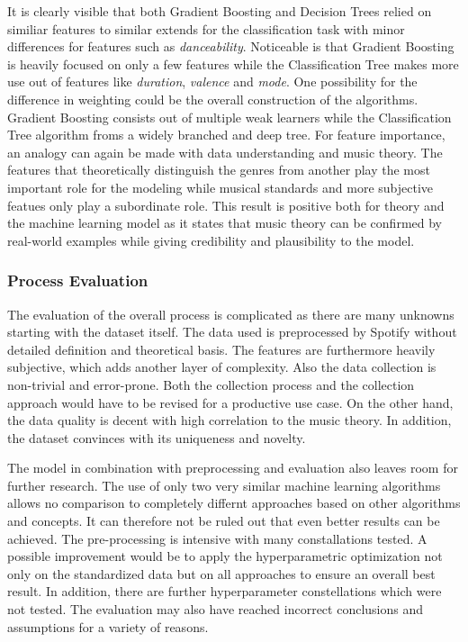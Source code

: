 It is clearly visible that both Gradient Boosting and Decision Trees relied on similiar features to similar extends for the classification task with 
minor differences for features such as \emph{danceability}. Noticeable is that Gradient Boosting is heavily focused on only a few features 
while the Classification Tree makes more use out of features like \emph{duration}, \emph{valence} and \emph{mode}. One possibility for the difference in weighting  
could be the overall construction of the algorithms. Gradient Boosting consists out of multiple weak learners while the Classification Tree
algorithm froms a widely branched and deep tree. For feature importance, an analogy can again be made with data understanding and music theory. 
The features that theoretically distinguish the genres from another play the most important role for the modeling while musical standards and 
more subjective featues only play a subordinate role. This result is positive both for theory and the machine learning model as it states 
that music theory can be confirmed by real-world examples while giving credibility and plausibility to the model.

\subsubsection{Process Evaluation}

The evaluation of the overall process is complicated as there are many unknowns starting with the dataset itself. The data used is preprocessed by 
Spotify without detailed definition and theoretical basis. The features are furthermore heavily subjective, which adds another layer of 
complexity. Also the data collection is non-trivial and error-prone. Both the collection process and the collection approach 
would have to be revised for a productive use case. On the other hand, the data quality is decent with high correlation to the music 
theory. In addition, the dataset convinces with its uniqueness and novelty.

The model in combination with preprocessing and evaluation also leaves room for further research. The use of only two very 
similar machine learning algorithms allows no comparison to completely differnt approaches based on other algorithms and concepts. 
It can therefore not be ruled out that even better results can be achieved. The pre-processing is intensive with many constallations 
tested. A possible improvement would be to apply the hyperparametric optimization not only on the standardized data but on all 
approaches to ensure an overall best result. In addition, there are further hyperparameter constellations which were not tested.
The evaluation may also have reached incorrect conclusions and assumptions for a variety of reasons. 

